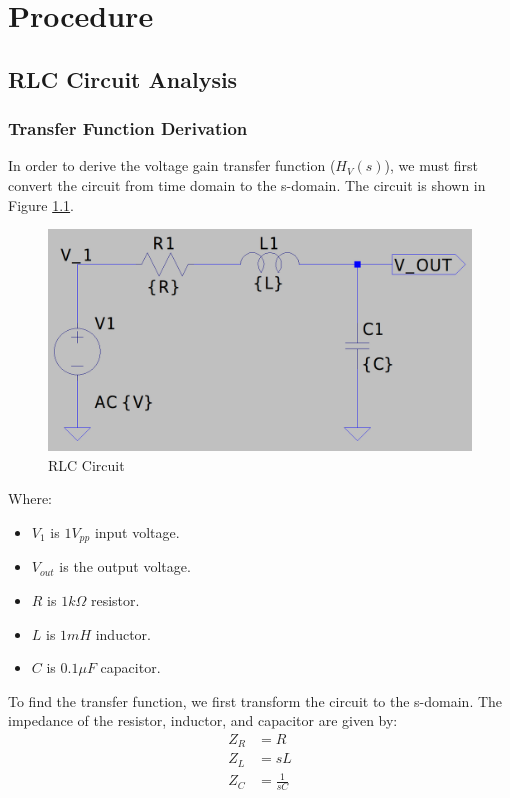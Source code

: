 \chapter{Procedure}

\section{RLC Circuit Analysis}

\subsection{Transfer Function Derivation}
In order to derive the voltage gain transfer function ($H_{V}(s)$), we must first convert the circuit from time domain to the s-domain. The circuit is shown in Figure \ref{fig:rlc_circuit}.

\begin{figure}[h]
    \centering
    \includegraphics[width=1\textwidth]{assets/rlc-circ.png}
    \caption{RLC Circuit}
    \label{fig:rlc_circuit}
\end{figure}

\noindent Where:
\begin{itemize}
    \item $V_{1}$ is $1 V_{pp}$ input voltage.
    \item $V_{out}$ is the output voltage.
    \item $R$ is $1k\Omega$ resistor.
    \item $L$ is $1mH$ inductor.
    \item $C$ is $0.1\mu F$ capacitor.
\end{itemize}

\newpage
\thispagestyle{plain}

To find the transfer function, we first transform the circuit to the s-domain. The impedance of the resistor, inductor, and capacitor are given by:
\begin{align*}
    Z_{R} &= R \\
    Z_{L} &= sL \\
    Z_{C} &= \frac{1}{sC}
\end{align*}

